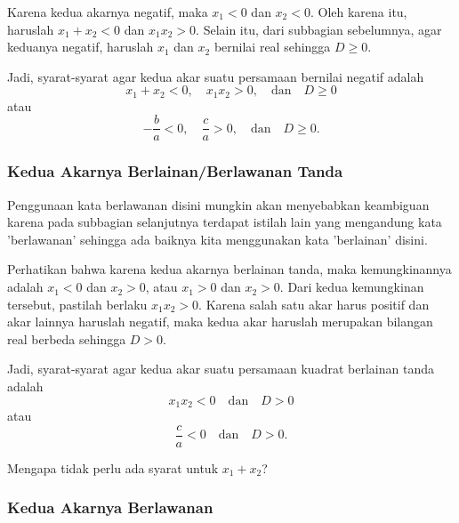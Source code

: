 		Karena kedua akarnya negatif, maka $ x_{1} < 0 $ dan $ x_{2} < 0 $. Oleh karena itu, haruslah $ x_{1} + x_{2} < 0 $ dan $ x_{1}x_{2} > 0 $. Selain itu, dari subbagian sebelumnya, agar keduanya negatif, haruslah $ x_{1} $ dan $ x_{2} $ bernilai real sehingga $ D \geq 0 $.
		
		\par Jadi, syarat-syarat agar kedua akar suatu persamaan bernilai negatif adalah
		\begin{equation} \label{eq:217}
			x_{1} + x_{2} < 0, \quad x_{1}x_{2} > 0, \quad \mbox{dan} \quad D \geq 0
		\end{equation}
		atau
		\[ -\frac{b}{a} < 0, \quad \frac{c}{a} > 0, \quad \mbox{dan} \quad D \geq 0. \]
	
	\subsubsection{Kedua Akarnya Berlainan/Berlawanan Tanda}
		
		Penggunaan kata berlawanan disini mungkin akan menyebabkan keambiguan karena pada subbagian selanjutnya terdapat istilah lain yang mengandung kata 'berlawanan' sehingga ada baiknya kita menggunakan kata 'berlainan' disini.
		
		\par Perhatikan bahwa karena kedua akarnya berlainan tanda, maka kemungkinannya adalah $ x_{1} < 0 $ dan $ x_{2} > 0 $, atau $ x_{1} > 0 $ dan $ x_{2} > 0 $. Dari kedua kemungkinan tersebut, pastilah berlaku $ x_{1}x_{2} > 0 $. Karena salah satu akar harus positif dan akar lainnya haruslah negatif, maka kedua akar haruslah merupakan bilangan real berbeda sehingga $ D > 0 $.
		
		\par Jadi, syarat-syarat agar kedua akar suatu persamaan kuadrat berlainan tanda adalah
		\begin{equation} \label{eq:218}
			x_{1}x_{2} < 0 \quad \mbox{dan} \quad D > 0
		\end{equation}
		atau
		\[ \frac{c}{a} < 0 \quad \mbox{dan} \quad D > 0. \]
		
		\begin{explbox}
			Mengapa tidak perlu ada syarat untuk $ x_{1} + x_{2} $?
		\end{explbox}
	
	\subsubsection{Kedua Akarnya Berlawanan}
		
